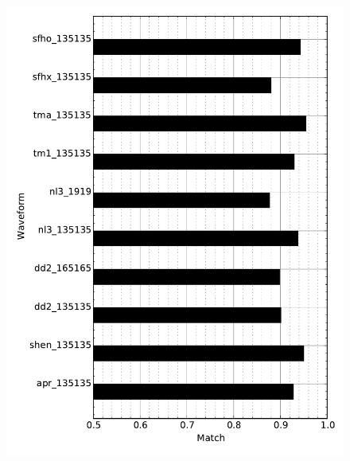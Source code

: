 \documentclass[serif,mathserif,10pt]{beamer}
\begin{document}
\begin{frame}
\begin{columns}[]
        \begin{center}
            \vspace{-0.5cm}
            \begin{figure}
                \includegraphics[width=\columnwidth]{figures/match_bars_exctestwav.pdf}
            \end{figure}
        \end{center}


    \end{columns}

\end{frame}
\end{document}
